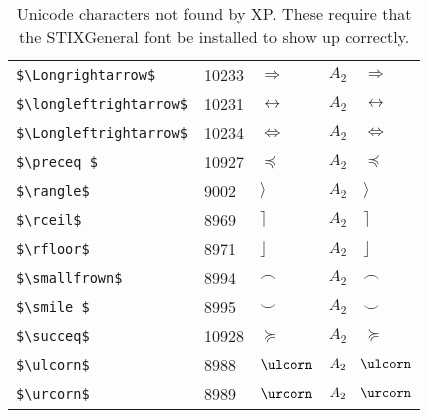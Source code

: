 \documentclass{article}
\begin{document}
\begin{table}
\begin{center}
\begin{tabular}{llll}
\verb#$\Longrightarrow$#      & 10233 & $\Longrightarrow$ & $A_2 \quad \Longrightarrow$\\
\verb#$\longleftrightarrow$#  & 10231 & $\longleftrightarrow$ & $A_2 \quad \longleftrightarrow $\\
\verb#$\Longleftrightarrow$#  & 10234 & $\Longleftrightarrow$ & $A_2 \quad \Longleftrightarrow$\\
\verb#$\preceq $#             & 10927 & $\preceq $        & $A_2 \quad \preceq $\\
\verb#$\rangle$#              &  9002 & $\rangle$         & $A_2 \quad \rangle$\\
\verb#$\rceil$#               &  8969 & $\rceil$          & $A_2 \quad \rceil$\\
\verb#$\rfloor$#              &  8971 & $\rfloor$         & $A_2 \quad \rfloor$\\
\verb#$\smallfrown$#          &  8994 & $\smallfrown$     & $A_2 \quad \smallfrown$\\
\verb#$\smile $#              &  8995 & $\smile $         & $A_2 \quad \smile $\\
\verb#$\succeq$#              & 10928 & $\succeq$         & $A_2 \quad \succeq$\\
\verb#$\ulcorn$#              &  8988 & $\ulcorn$         & $A_2 \quad \ulcorn$\\
\verb#$\urcorn$#              &  8989 & $\urcorn$         & $A_2 \quad \urcorn$\\
\end{tabular}
\end{center}
\caption{Unicode characters not found by XP.  These require that the STIXGeneral
font be installed to show up correctly.}
\end{table}
\end{document}
